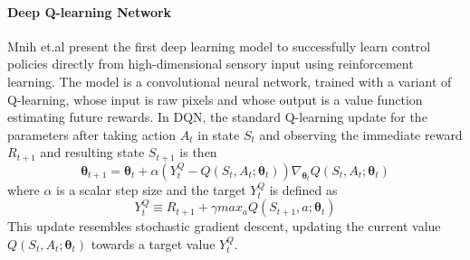 \paragraph{Deep Q-learning Network}  Mnih et.al present the first deep learning model to successfully learn control policies directly from high-dimensional sensory input using reinforcement learning.\cite{silver2016mastering} The model is a convolutional neural network, trained with a variant of Q-learning, whose input is raw pixels and whose output is a value function estimating future rewards. In DQN, the standard Q-learning update for the parameters after taking action $A_t$ in state $S_t$ and observing the immediate reward $R_{t+1}$ and resulting state $S_{t+1}$ is then 
\begin{equation}
\bm{\theta}_{t+1} = \bm{\theta}_{t} + \alpha (Y_{t}^{Q} - Q(S_{t}, A_{t}; \bm{\theta}_{t}))\nabla_{\bm{\theta}_{t}}Q(S_{t}, A_{t}; \bm{\theta}_{t})
\end{equation}
where $\alpha$ is a scalar step size and the target $Y_{t}^{Q}$ is defined as 
\begin{equation}
Y_{t}^{Q} \equiv R_{t+1} + \gamma max_{a}Q(S_{t+1},a;\bm{\theta}_{t})
\end{equation}
This update resembles stochastic gradient descent, updating the current value $Q(S_{t}, A_{t};\bm{\theta}_{t})$ towards a target value $Y_{t}^{Q}$.